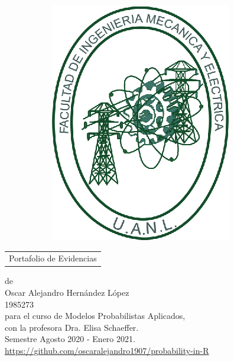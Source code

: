 \begin{scshape}
\begin{center}
\begin{figure}[h!]
\begin{subfigure}{0.2\linewidth}
			\includegraphics[width=\linewidth]{fig/fime}
		\end{subfigure}
	\end{figure}
	\vskip16mm
	\begin{tabular}{p{11cm}}
		\centering
		{\large Portafolio de Evidencias}
	\end{tabular}
	\vskip7mm
	{de}\\[7mm]
	{\large Oscar Alejandro Hernández López}\\[3mm]
	{1985273}\\[7 mm]
	{para el curso de Modelos Probabilistas Aplicados,}\\[3mm]
	{con la profesora Dra. Elisa Schaeffer.}\\[3mm]
	Semestre Agosto 2020 - Enero 2021. \\ [5 mm]
	\url{https://github.com/oscaralejandro1907/probability-in-R}
	\vfill
\end{center}
\end{scshape}